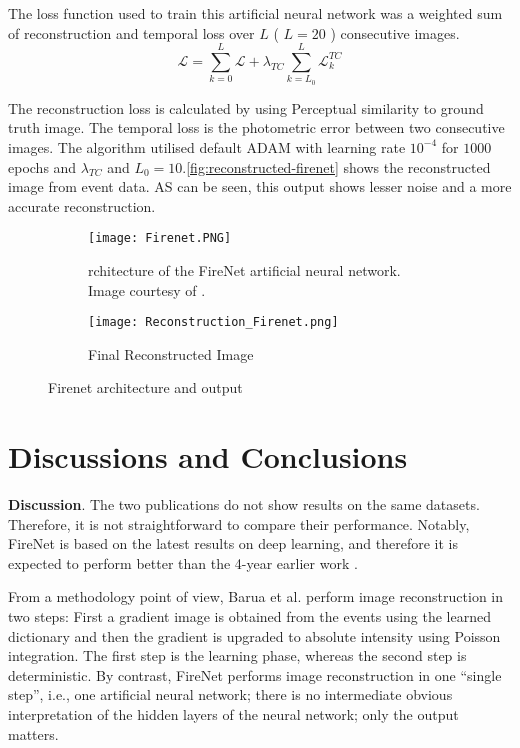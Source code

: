 \documentclass[10pt]{report}
\begin{document}
The loss function used to train this artificial neural network was a weighted sum of reconstruction and temporal loss over  $L$ ( $L = 20$ ) consecutive images.
\begin{equation}
    \mathcal{L} = \sum_{k=0}^{L}\mathcal{L} + \lambda_{TC} \sum_{k = L_{0}}^{L}\mathcal{L}_{k}^{TC}
\end{equation}

The reconstruction loss is calculated by using Perceptual similarity \cite{Zhang18cvprLPIPS} to ground truth image. 
The temporal loss is the photometric error \cite{Rebecq19pami} between two consecutive images. 
The algorithm utilised default ADAM \cite{Kingma15iclr} with learning rate $10^{-4}$ for $1000$ epochs and $\lambda_{TC}$ and $L_{0} = 10$.\autoref{fig:reconstructed-firenet} shows the reconstructed image from event data. AS can be seen, this output shows lesser noise and a more accurate reconstruction.

\begin{figure}
\centering
\begin{subfigure}{.45\linewidth}
  \centering
  \texttt{[image: Firenet.PNG]}
  \caption{rchitecture of the FireNet artificial neural network. Image courtesy of \cite{Scheerlinck20wacv}.}
  \label{fig:firenet}
\end{subfigure}\;\;
\begin{subfigure}{.45\linewidth}
  \centering
  \texttt{[image: Reconstruction\_Firenet.png]}
  \caption{Final Reconstructed Image}
  \label{fig:reconstructed-firenet}
\end{subfigure}
\caption{Firenet architecture and output}
\label{fig:reconstruction-firenet}
\end{figure}



\section{Discussions and Conclusions}
\label{sec:discussions}

\textbf{Discussion}.
The two publications \cite{Barua16wacv,Scheerlinck20wacv} do not show results on the same datasets.
Therefore, it is not straightforward to compare their performance.
Notably, FireNet \cite{Scheerlinck20wacv} is based on the latest results on deep learning, and therefore it is expected to perform better than the 4-year earlier work \cite{Barua16wacv}.

From a methodology point of view, Barua et al. \cite{Barua16wacv} perform image reconstruction in two steps: 
First a gradient image is obtained from the events using the learned dictionary and then the gradient is upgraded to absolute intensity using Poisson integration.
The first step is the learning phase, whereas the second step is deterministic.
By contrast, FireNet \cite{Scheerlinck20wacv} performs image reconstruction in one ``single step'', i.e., one artificial neural network; there is no intermediate obvious interpretation of the hidden layers of the neural network; only the output matters.
\end{document}
